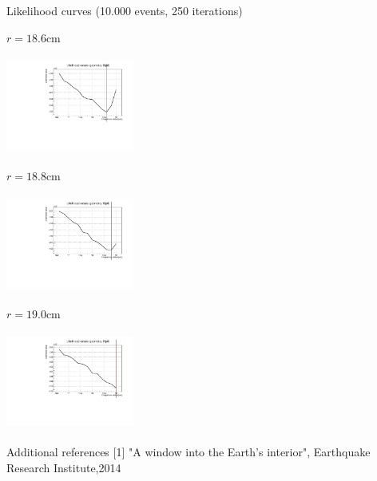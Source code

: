 \documentclass[8 pt]{beamer}
\newcommand{\backupend}{
   \setcounter{framenumber}{\value{finalframe}}
}
\begin{document}
\begin{frame}{Likelihood curves (10.000 events, 250 iterations)}
\vspace{-5pt}
\begin{minipage}[c]{.32\textwidth}
\begin{exampleblock}{} \begin{center}$r = 18.6$cm\end{center} \end{exampleblock}
\includegraphics[width=4.2cm, height=3.2cm]{figs/likelihood250LowStat/likelihood18p6.pdf} 
\end{minipage}
\begin{minipage}[c]{.32\textwidth}
\begin{exampleblock}{} \begin{center}$r = 18.8$cm\end{center} \end{exampleblock}
\includegraphics[width=4.2cm, height=3.2cm]{figs/likelihood250LowStat/likelihood18p8.pdf} 
\end{minipage}
\begin{minipage}[c]{.32\textwidth}
\begin{exampleblock}{} \begin{center}$r = 19.0$cm\end{center} \end{exampleblock}
\includegraphics[width=4.2cm, height=3.2cm]{figs/likelihood250LowStat/likelihood19p0.pdf} 
\end{minipage}
\end{frame}


\begin{frame}{Additional references}
[1] "A window into the Earth’s interior", Earthquake Research Institute,2014
\end{frame}

\backupend


 
\end{document}
